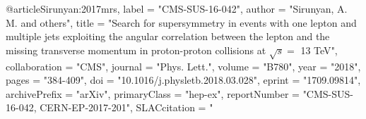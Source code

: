 @article{Sirunyan:2017mrs,
      label          = "CMS-SUS-16-042",
      author         = "Sirunyan, A. M. and others",
      title          = "{Search for supersymmetry in events with one lepton and
                        multiple jets exploiting the angular correlation between
                        the lepton and the missing transverse momentum in
                        proton-proton collisions at $\sqrt{s} = $ 13 TeV}",
      collaboration  = "CMS",
      journal        = "Phys. Lett.",
      volume         = "B780",
      year           = "2018",
      pages          = "384-409",
      doi            = "10.1016/j.physletb.2018.03.028",
      eprint         = "1709.09814",
      archivePrefix  = "arXiv",
      primaryClass   = "hep-ex",
      reportNumber   = "CMS-SUS-16-042, CERN-EP-2017-201",
      SLACcitation   = "%
}

